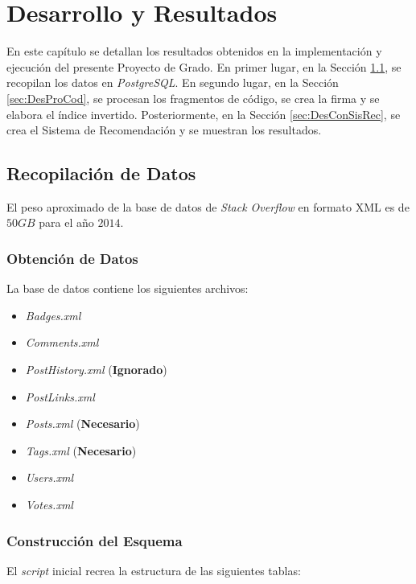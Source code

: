 \chapter{Desarrollo y Resultados}

En este capítulo se detallan los resultados obtenidos en la implementación y
ejecución del presente Proyecto de Grado. En primer lugar, en la Sección \ref{sec:DesRecDat},
se recopilan los datos en \textit{PostgreSQL}.
En segundo lugar, en la Sección \ref{sec:DesProCod}, se procesan los fragmentos 
de código, se crea la firma y se elabora el índice invertido. 
Posteriormente, en la Sección \ref{sec:DesConSisRec}, se crea el Sistema de Recomendación
y se muestran los resultados.

\section{Recopilación de Datos}
\label{sec:DesRecDat}

El peso aproximado de la base de datos de \textit{Stack Overflow} en formato \ac{XML}
es de $50GB$ para el año $2014$. 

\subsection{Obtención de Datos}

La base de datos contiene los siguientes archivos: 

\begin{itemize}
  \item \textit{Badges.xml}
  \item \textit{Comments.xml}
  \item \textit{PostHistory.xml} (\textbf{Ignorado})
  \item \textit{PostLinks.xml}
  \item \textit{Posts.xml} (\textbf{Necesario})
  \item \textit{Tags.xml} (\textbf{Necesario})
  \item \textit{Users.xml}
  \item \textit{Votes.xml}
\end{itemize}

\subsection{Construcción del Esquema}

El \textit{script} inicial recrea la estructura de las siguientes tablas:

